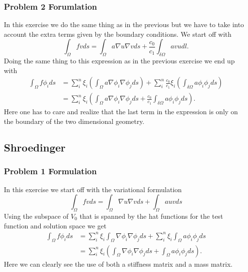 \documentclass[11pt]{article}
\begin{document}
\subsubsection{Problem 2 Forumlation}
In this exercise we do the same thing as in the previous but we have to take into account the extra terms given by the boundary conditions. We start off with
\begin{equation}
	\int_{\Omega} f v ds = \int_{\Omega} a \nabla u \nabla v ds + \frac{c_0}{c_1}  \int_{\delta \Omega} a v u dl.
\end{equation}
Doing the same thing to this expression as in the previous exercise we end up with
\begin{align}
	\int_{\Omega} f \phi_i ds &=  \sum^n_i \xi_i (\int_{\Omega} a \nabla \phi_i \nabla \phi_j ds) + \sum^n_i \frac{c_0}{c_1} \xi_i (\int_{\delta \Omega} a \phi_i \phi_j ds) \\
	&= \sum^n_i \xi_i ( \int_{\Omega} a \nabla \phi_i \nabla \phi_j ds + \frac{c_0}{c_1} \int_{\delta \Omega} a \phi_i \phi_j ds).
\end{align}
Here one has to care and realize that the last term in the expression is only on the boundary of the two dimensional geometry. 
\subsection{Shroedinger}
\subsubsection{Problem 1 Formulation}
In this exercise we start off with the variational formulation
\begin{equation}
	\int_{\Omega} fv ds= \int_{\Omega} \nabla u \nabla v ds + \int_{\Omega} a u v ds
\end{equation}
Using the subspace of $V_0$ that is spanned by the hat functions for the test function and solution space we get
\begin{align}
	\int_{\Omega} f \phi_i ds &= \sum^n_i \xi_i \int_{\Omega} \nabla \phi_i \nabla \phi_j ds + \sum^n_i \xi_i \int_{\Omega}a \phi_i \phi_j ds \\
	&= \sum^n_i \xi_i ( \int_{\Omega} \nabla \phi_i \nabla \phi_j ds + \int_{\Omega}a \phi_i \phi_j ds).
\end{align}
Here we can clearly see the use of both a stiffness matrix and a mass matrix. 
\end{document}
